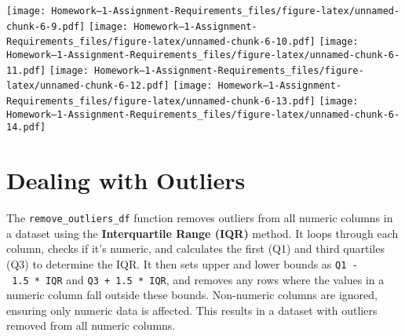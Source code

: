 \documentclass[
]{article}
\newenvironment{Shaded}{\begin{snugshade}}{\end{snugshade}}
\newcommand{\AttributeTok}[1]{\textcolor[rgb]{0.13,0.29,0.53}{#1}}
\newcommand{\CommentTok}[1]{\textcolor[rgb]{0.56,0.35,0.01}{\textit{#1}}}
\newcommand{\ConstantTok}[1]{\textcolor[rgb]{0.56,0.35,0.01}{#1}}
\newcommand{\ControlFlowTok}[1]{\textcolor[rgb]{0.13,0.29,0.53}{\textbf{#1}}}
\newcommand{\DecValTok}[1]{\textcolor[rgb]{0.00,0.00,0.81}{#1}}
\newcommand{\FunctionTok}[1]{\textcolor[rgb]{0.13,0.29,0.53}{\textbf{#1}}}
\newcommand{\NormalTok}[1]{#1}
\newcommand{\SpecialCharTok}[1]{\textcolor[rgb]{0.81,0.36,0.00}{\textbf{#1}}}
\newcommand{\StringTok}[1]{\textcolor[rgb]{0.31,0.60,0.02}{#1}}
\begin{document}
\begin{Shaded}
\end{Shaded}

\texttt{[image: Homework--1-Assignment-Requirements\_files/figure-latex/unnamed-chunk-6-9.pdf]}
\texttt{[image: Homework--1-Assignment-Requirements\_files/figure-latex/unnamed-chunk-6-10.pdf]}
\texttt{[image: Homework--1-Assignment-Requirements\_files/figure-latex/unnamed-chunk-6-11.pdf]}
\texttt{[image: Homework--1-Assignment-Requirements\_files/figure-latex/unnamed-chunk-6-12.pdf]}
\texttt{[image: Homework--1-Assignment-Requirements\_files/figure-latex/unnamed-chunk-6-13.pdf]}
\texttt{[image: Homework--1-Assignment-Requirements\_files/figure-latex/unnamed-chunk-6-14.pdf]}

\hypertarget{dealing-with-outliers}{%
\section{Dealing with Outliers}\label{dealing-with-outliers}}

The \texttt{remove\_outliers\_df} function removes outliers from all
numeric columns in a dataset using the \textbf{Interquartile Range
(IQR)} method. It loops through each column, checks if it's numeric, and
calculates the first (Q1) and third quartiles (Q3) to determine the IQR.
It then sets upper and lower bounds as \texttt{Q1\ -\ 1.5\ *\ IQR} and
\texttt{Q3\ +\ 1.5\ *\ IQR}, and removes any rows where the values in a
numeric column fall outside these bounds. Non-numeric columns are
ignored, ensuring only numeric data is affected. This results in a
dataset with outliers removed from all numeric columns.
\end{document}
